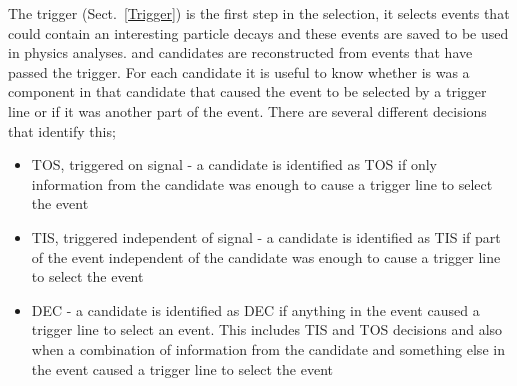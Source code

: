 

The trigger (Sect.~\ref{Trigger}) is the first step in the selection, it selects events that could contain an interesting particle decays and these events are saved to be used in physics analyses. \bsmumu and \bhh candidates are reconstructed from events that have passed the trigger. For each candidate it is useful to know whether is was a component in that candidate that caused the event to be selected by a trigger line or if it was another part of the event. There are several different decisions that identify this;
\begin{itemize}
\item TOS, triggered on signal - a candidate is identified as TOS if only information from the candidate was enough to cause a trigger line to select the event
\item TIS, triggered independent of signal - a candidate is identified as TIS if part of the event independent of the candidate was enough to cause a trigger line to select the event
\item DEC - a candidate is identified as DEC if anything in the event caused a trigger line to select an event. This includes TIS and TOS decisions and also when a combination of information from the candidate and something else in the event caused a trigger line to select the event
\end{itemize}

